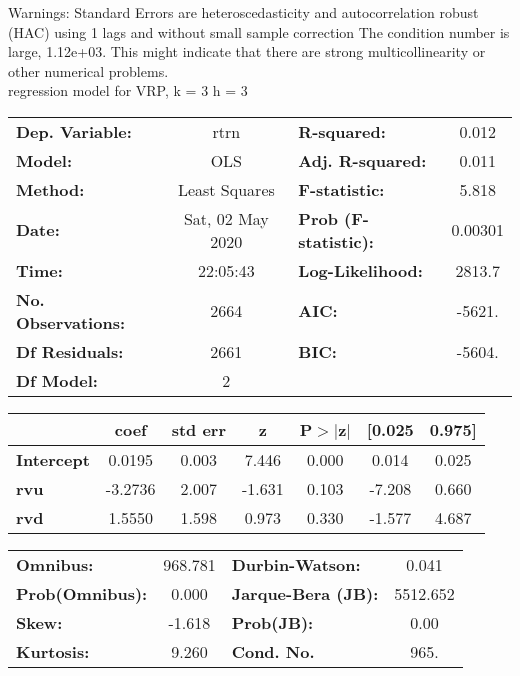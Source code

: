 Warnings: \newline
 [1] Standard Errors are heteroscedasticity and autocorrelation robust (HAC) using 1 lags and without small sample correction \newline
 [2] The condition number is large, 1.12e+03. This might indicate that there are \newline
 strong multicollinearity or other numerical problems.\\ 

regression model for VRP, k = 3 h = 3\begin{center}
\begin{tabular}{lclc}
\toprule
\textbf{Dep. Variable:}    &       rtrn       & \textbf{  R-squared:         } &     0.012   \\
\textbf{Model:}            &       OLS        & \textbf{  Adj. R-squared:    } &     0.011   \\
\textbf{Method:}           &  Least Squares   & \textbf{  F-statistic:       } &     5.818   \\
\textbf{Date:}             & Sat, 02 May 2020 & \textbf{  Prob (F-statistic):} &  0.00301    \\
\textbf{Time:}             &     22:05:43     & \textbf{  Log-Likelihood:    } &    2813.7   \\
\textbf{No. Observations:} &        2664      & \textbf{  AIC:               } &    -5621.   \\
\textbf{Df Residuals:}     &        2661      & \textbf{  BIC:               } &    -5604.   \\
\textbf{Df Model:}         &           2      & \textbf{                     } &             \\
\bottomrule
\end{tabular}
\begin{tabular}{lcccccc}
                   & \textbf{coef} & \textbf{std err} & \textbf{z} & \textbf{P$> |$z$|$} & \textbf{[0.025} & \textbf{0.975]}  \\
\midrule
\textbf{Intercept} &       0.0195  &        0.003     &     7.446  &         0.000        &        0.014    &        0.025     \\
\textbf{rvu}       &      -3.2736  &        2.007     &    -1.631  &         0.103        &       -7.208    &        0.660     \\
\textbf{rvd}       &       1.5550  &        1.598     &     0.973  &         0.330        &       -1.577    &        4.687     \\
\bottomrule
\end{tabular}
\begin{tabular}{lclc}
\textbf{Omnibus:}       & 968.781 & \textbf{  Durbin-Watson:     } &    0.041  \\
\textbf{Prob(Omnibus):} &   0.000 & \textbf{  Jarque-Bera (JB):  } & 5512.652  \\
\textbf{Skew:}          &  -1.618 & \textbf{  Prob(JB):          } &     0.00  \\
\textbf{Kurtosis:}      &   9.260 & \textbf{  Cond. No.          } &     965.  \\
\bottomrule
\end{tabular}
\end{center}

